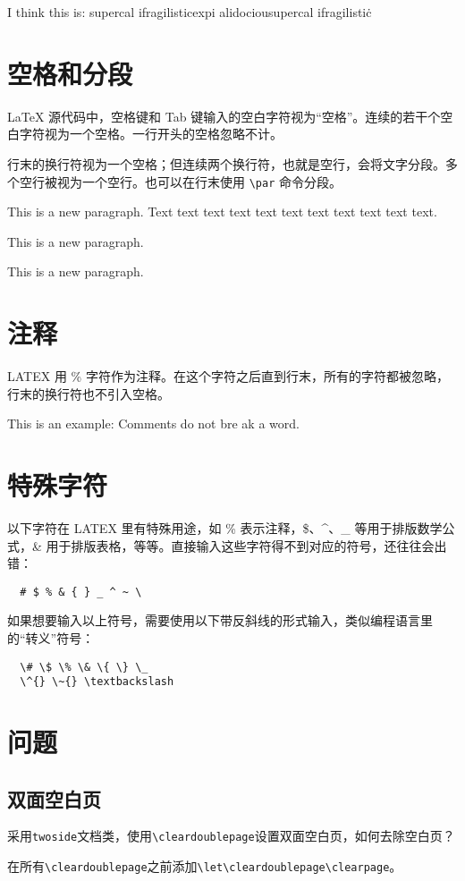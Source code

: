 \begin{codeshow}
  I think this is: su\-per\-cal\-%
  i\-frag\-i\-lis\-tic\-ex\-pi\-%
  al\-i\-do\-ciousu\-per\-cal\-%
  i\-frag\-i\-lis\-tic\.
\end{codeshow}

\section{空格和分段}\label{sec:space}
\LaTeX{} 源代码中，空格键和 Tab 键输入的空白字符视为“空格”。连续的若干个空白字符视为一个空格。一行开头的空格忽略不计。

行末的换行符视为一个空格；但连续两个换行符，也就是空行，会将文字分段。多个空行被视为一个空行。也可以在行末使用 \lstinline{\par} 命令分段。

\begin{codeshow}
  This is a new paragraph. Text text text
  text text   text text text text text text.

  This is a new paragraph.\par
  This is a new paragraph.
\end{codeshow}

\section{注释}\label{sec:comment}
LATEX 用 \% 字符作为注释。在这个字符之后直到行末，所有的字符都被忽略，行末的换行符也不引入空格。

\begin{codeshow}
  This is an %
  example: Comments do not bre%
  ak a word.
\end{codeshow}

\section{特殊字符}\label{sec:special}

以下字符在 LATEX 里有特殊用途，如 \% 表示注释，\$、\^{}、\_ 等用于排版数学公式，\& 用于排版表格，等等。直接输入这些字符得不到对应的符号，还往往会出错：

\begin{lstlisting}
  # $ % & { } _ ^ ~ \
\end{lstlisting}

如果想要输入以上符号，需要使用以下带反斜线的形式输入，类似编程语言里的“转义”符号：
\begin{lstlisting}
  \# \$ \% \& \{ \} \_
  \^{} \~{} \textbackslash
\end{lstlisting}

\section{问题}\label{sec:qa}
\subsection{双面空白页}\label{subsec:blankpage}
采用\lstinline{twoside}文档类，使用\lstinline{\cleardoublepage}设置双面空白页，如何去除空白页？

在所有\lstinline{\cleardoublepage}之前添加\lstinline{\let\cleardoublepage\clearpage}。